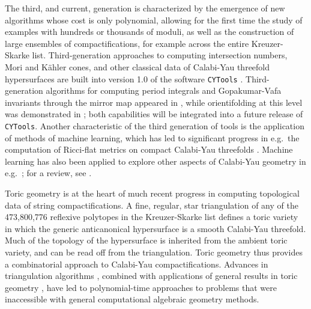 \documentclass[12pt,a4wide]{article}
\begin{document}
The third, and current, generation is characterized by the emergence of new algorithms whose cost is only polynomial, allowing for the first time the study of examples with hundreds or thousands of moduli, as well as the construction of large ensembles of compactifications, for example across the entire Kreuzer-Skarke list.
Third-generation approaches to computing intersection numbers, Mori and K\"ahler cones, and other classical data of Calabi-Yau threefold hypersurfaces are built into version 1.0 of the software \texttt{CYTools} \cite{Demirtas:2022hqf}.  Third-generation algorithms for computing period integrals and Gopakumar-Vafa invariants through the mirror map appeared in \cite{Demirtas:2023als}, while orientifolding at this level was demonstrated in \cite{Moritz:2023jdb}; both capabilities will be integrated into a future release of \texttt{CYTools}.
Another characteristic of the third generation of tools is the application of methods of machine learning, which has led to significant progress in e.g.~the computation of Ricci-flat metrics on compact Calabi-Yau threefolds  \cite{Ashmore:2019wzb,Cui:2019uhy,Anderson:2020hux,Douglas:2020hpv,Larfors:2022nep,Berglund:2022gvm,Gerdes:2022nzr,Ashmore:2023ajy}. Machine learning has also been applied to explore other aspects of Calabi-Yau geometry in e.g.~\cite{Bull:2018uow,Berman:2021mcw,Jejjala:2022lxh,Berglund:2023ztk,Erbin:2021hmx,Klaewer:2018sfl,Cole:2019enn,Cole:2021nnt,Krippendorf:2021uxu}; for a review, see \cite{Ruehle:2020jrk}.
 


Toric geometry is at the heart of much recent progress in computing topological data of string compactifications.  A fine, regular, star triangulation of any of the 473{,}800{,}776 reflexive polytopes in the Kreuzer-Skarke list \cite{Kreuzer:2000xy} defines a toric variety in which the generic anticanonical hypersurface is a smooth Calabi-Yau threefold.
Much of the topology of the hypersurface is inherited from the ambient toric variety, and can be read off from the triangulation.  Toric geometry thus provides a combinatorial approach to Calabi-Yau compactifications.  Advances in triangulation algorithms \cite{Demirtas:2022hqf,MacFadden:2023cyf}, 
combined with applications of general results in toric geometry
\cite{Demirtas:2023als,Moritz:2023jdb},
have led to polynomial-time approaches to problems that were inaccessible with general computational algebraic geometry methods.
\end{document}
